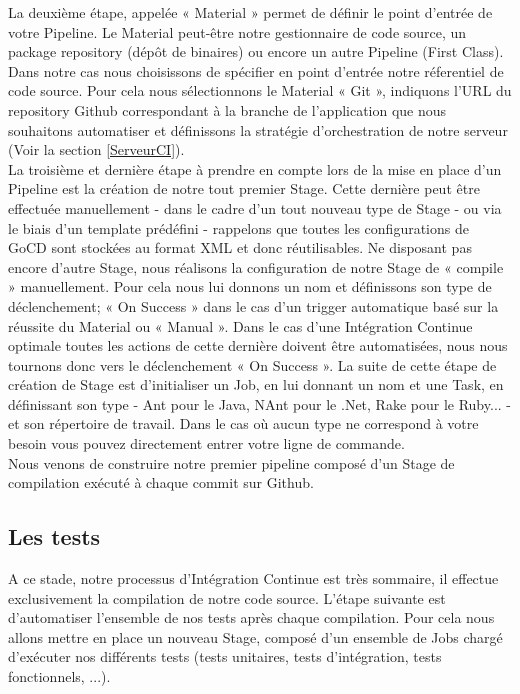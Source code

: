       La deuxième étape, appelée « Material » permet de définir le point d'entrée de votre Pipeline. Le Material peut-être notre gestionnaire de code source, un package repository (dépôt de binaires) ou encore un autre Pipeline (First Class). Dans notre cas nous choisissons de spécifier en point d'entrée notre réferentiel de code source. Pour cela nous sélectionnons le Material « Git », indiquons l'URL du repository Github correspondant à la branche de l'application que nous souhaitons automatiser et définissons la stratégie d'orchestration de notre serveur (Voir la section \ref{ServeurCI}).\\

      La troisième et dernière étape à prendre en compte lors de la mise en place d'un Pipeline est la création de notre tout premier Stage. Cette dernière peut être effectuée manuellement - dans le cadre d'un tout nouveau type de Stage - ou via le biais d'un template prédéfini - rappelons que toutes les configurations de GoCD sont stockées au format XML et donc réutilisables. Ne disposant pas encore d'autre Stage, nous réalisons la configuration de notre Stage de « compile » manuellement. Pour cela nous lui donnons un nom et définissons son type de déclenchement; « On Success » dans le cas d'un trigger automatique basé sur la réussite du Material ou « Manual ». Dans le cas d'une Intégration Continue optimale toutes les actions de cette dernière doivent être automatisées, nous nous tournons donc vers le déclenchement « On Success ». La suite de cette étape de création de Stage est d'initialiser un Job, en lui donnant un nom et une Task, en définissant son type - Ant pour le Java, NAnt pour le .Net, Rake pour le Ruby... - et son répertoire de travail. Dans le cas où aucun type ne correspond à votre besoin vous pouvez directement entrer votre ligne de commande.\\

      Nous venons de construire notre premier pipeline composé d'un Stage de compilation exécuté à chaque commit sur Github.

      \subsection{Les tests}
      A ce stade, notre processus d'Intégration Continue est très sommaire, il effectue exclusivement la compilation de notre code source. L'étape suivante est d'automatiser l'ensemble de nos tests après chaque compilation. Pour cela nous allons mettre en place un nouveau Stage, composé d'un ensemble de Jobs chargé d'exécuter nos différents tests (tests unitaires, tests d'intégration, tests fonctionnels, ...).\\

